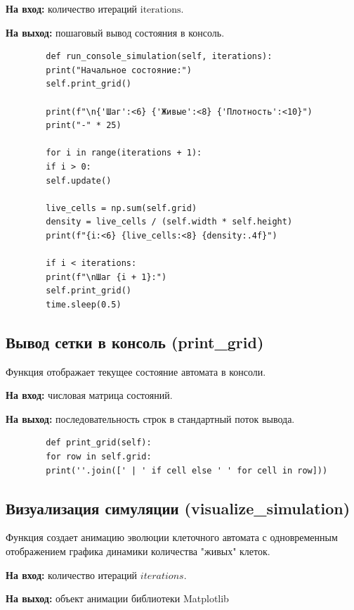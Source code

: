 \documentclass[11pt,a4paper,final]{article}
\begin{document}
	\textbf{На вход:} количество итераций $\text{iterations}$.  
	\par \textbf{На выход:} пошаговый вывод состояния в консоль.
	
	\begin{verbatim}
		def run_console_simulation(self, iterations):
		print("Начальное состояние:")
		self.print_grid()
		
		print(f"\n{'Шаг':<6} {'Живые':<8} {'Плотность':<10}")
		print("-" * 25)
		
		for i in range(iterations + 1):
		if i > 0:
		self.update()
		
		live_cells = np.sum(self.grid)
		density = live_cells / (self.width * self.height)
		print(f"{i:<6} {live_cells:<8} {density:.4f}")
		
		if i < iterations:
		print(f"\nШаг {i + 1}:")
		self.print_grid()
		time.sleep(0.5)
	\end{verbatim}
	
	\subsection{Вывод сетки в консоль (print\_grid)}
	
	Функция отображает текущее состояние автомата в консоли.
	
	\textbf{На вход:} числовая матрица состояний.  
	\par \textbf{На выход:} последовательность строк в стандартный поток вывода.
	
	\begin{verbatim}
		def print_grid(self):
		for row in self.grid:
		print(''.join([' | ' if cell else ' ' for cell in row]))
	\end{verbatim}
	
	\subsection{Визуализация симуляции (visualize\_simulation)}
	
	Функция создает анимацию эволюции клеточного автомата с одновременным отображением графика динамики количества "живых" клеток.
	
	\textbf{На вход:} количество итераций $iterations$.  
	\par \textbf{На выход:} объект анимации библиотеки Matplotlib
	
\end{document}
